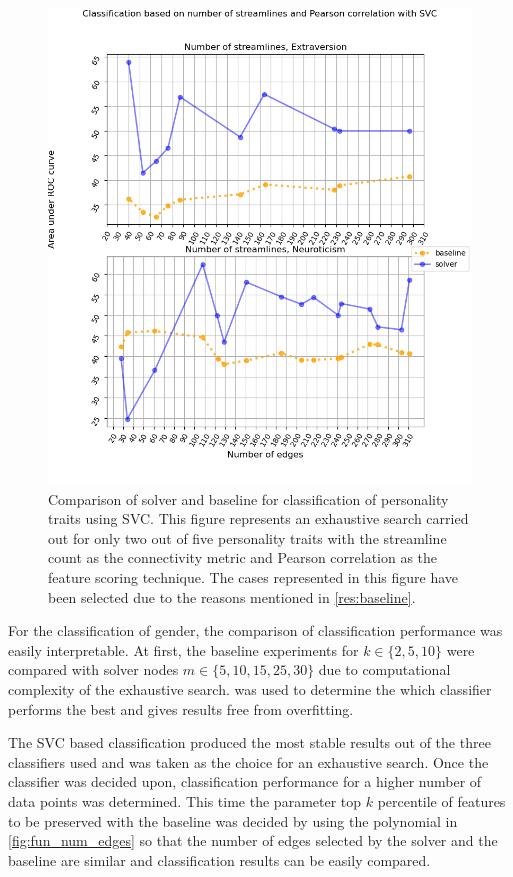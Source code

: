 \documentclass[msthesis.tex]{subfiles}
\begin{document}
\begin{figure}[]
    \centering
    \includegraphics[width=\textwidth]{images/persona_comp.png}
    \caption{Comparison of solver and baseline for classification of personality traits using \gls{SVC}. This figure represents an exhaustive search carried out for only two out of five personality traits with the streamline count as the connectivity metric and Pearson correlation as the feature scoring technique. The cases represented in this figure have been selected due to the reasons mentioned in \autoref{res:baseline}.}
    \label{fig:persona_com}
\end{figure}
For the classification of gender, the comparison of classification performance was easily interpretable. At first, the baseline experiments for $k \in \{2,5,10\}$ were compared with solver nodes $m \in \{5,10,15,25,30\}$ due to computational complexity of the exhaustive search.  was used to determine the which classifier performs the best and gives results free from overfitting. 

The \gls{SVC} based classification produced the most stable results out of the three classifiers used and was taken as the choice for an exhaustive search. Once the classifier was decided upon, classification performance for a higher number of data points was determined.  This time the parameter top $k$ percentile of features to be preserved with the baseline was decided by using the polynomial in \cref{fig:fun_num_edges} so that the number of edges selected by the solver and the baseline are similar and classification results can be easily compared. 
\end{document}
